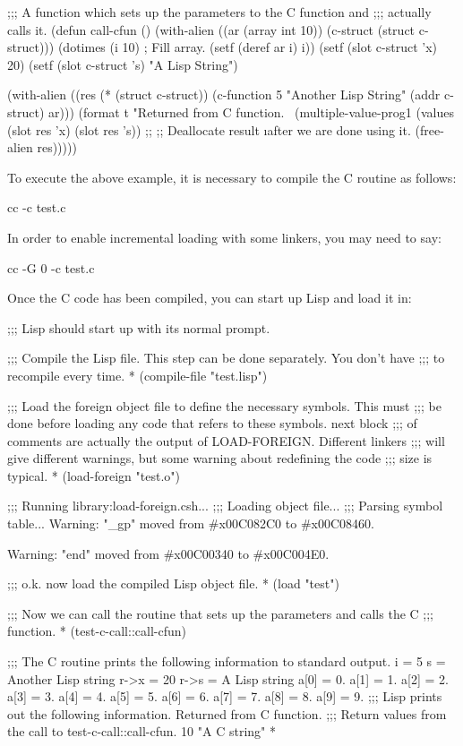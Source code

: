 {\begin{lisp}
;;; A function which sets up the parameters to the C function and
;;; actually calls it.
(defun call-cfun ()
  (with-alien ((ar (array int 10))
	       (c-struct (struct c-struct)))
    (dotimes (i 10)                     ; Fill array.
      (setf (deref ar i) i))
    (setf (slot c-struct 'x) 20)
    (setf (slot c-struct 's) "A Lisp String")

    (with-alien ((res (* (struct c-struct))
		      (c-function 5 "Another Lisp String" (addr c-struct) ar)))
      (format t "Returned from C function.~%
      (multiple-value-prog1
	  (values (slot res 'x)
		  (slot res 's))
	;;		
	;; Deallocate result \i{after} we are done using it.
	(free-alien res)))))
\end{lisp}
To execute the above example, it is necessary to compile the C routine as
follows:
\begin{example}
cc -c test.c
\end{example}
In order to enable incremental loading with some linkers, you may need to say:
\begin{example}
cc -G 0 -c test.c
\end{example}
Once the C code has been compiled, you can start up Lisp and load it in:
\begin{example}
;;; Lisp should start up with its normal prompt.

;;; Compile the Lisp file.  This step can be done separately.  You don't have
;;; to recompile every time.
* (compile-file "test.lisp")

;;; Load the foreign object file to define the necessary symbols.  This must
;;; be done before loading any code that refers to these symbols.  next block
;;; of comments are actually the output of LOAD-FOREIGN.  Different linkers
;;; will give different warnings, but some warning about redefining the code
;;; size is typical.
* (load-foreign "test.o")

;;; Running library:load-foreign.csh...
;;; Loading object file...
;;; Parsing symbol table...
Warning:  "_gp" moved from #x00C082C0 to #x00C08460.

Warning:  "end" moved from #x00C00340 to #x00C004E0.

;;; o.k. now load the compiled Lisp object file.
* (load "test")

;;; Now we can call the routine that sets up the parameters and calls the C
;;; function.
* (test-c-call::call-cfun)

;;; The C routine prints the following information to standard output.
i = 5
s = Another Lisp string
r->x = 20
r->s = A Lisp string
a[0] = 0.
a[1] = 1.
a[2] = 2.
a[3] = 3.
a[4] = 4.
a[5] = 5.
a[6] = 6.
a[7] = 7.
a[8] = 8.
a[9] = 9.
;;; Lisp prints out the following information.
Returned from C function.
;;; Return values from the call to test-c-call::call-cfun.
10
"A C string"
*
\end{example}

}
